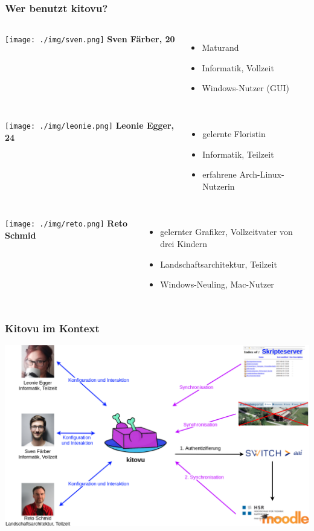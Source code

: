 \documentclass{beamer}
\begin{document}
	\begin{frame}
 	\frametitle{Wer benutzt kitovu?}
	 	\begin{columns}
	 		\texttt{[image: ./img/sven.png]}
			\textbf{Sven Färber, 20}
			\begin{itemize}
				\item Maturand
				\item Informatik, Vollzeit
				\item Windows-Nutzer (GUI)
			\end{itemize}
			
	 	\end{columns}
	 	\pause
		\begin{columns}
			\column{.5\textwidth}
			\texttt{[image: ./img/leonie.png]}
			\column{.5\textwidth}
			\textbf{Leonie Egger, 24}
			\begin{itemize}
				\item gelernte Floristin
				\item Informatik, Teilzeit
				\item erfahrene Arch-Linux-Nutzerin
			\end{itemize}
		\end{columns}
		\pause
		\begin{columns}
			\texttt{[image: ./img/reto.png]}
			\textbf{Reto Schmid}
		\begin{itemize}
			\item gelernter Grafiker, Vollzeitvater von drei Kindern
			\item Landschaftsarchitektur, Teilzeit
			\item Windows-Neuling, Mac-Nutzer
		\end{itemize}
		
		\end{columns}
	\end{frame}
	
	\begin{frame}
	\frametitle{Kitovu im Kontext}
	\includegraphics[width=\linewidth]{../03_End_of_Elaboration/img/kontextdiagramm.png}
	\end{frame}
	
\end{document}
